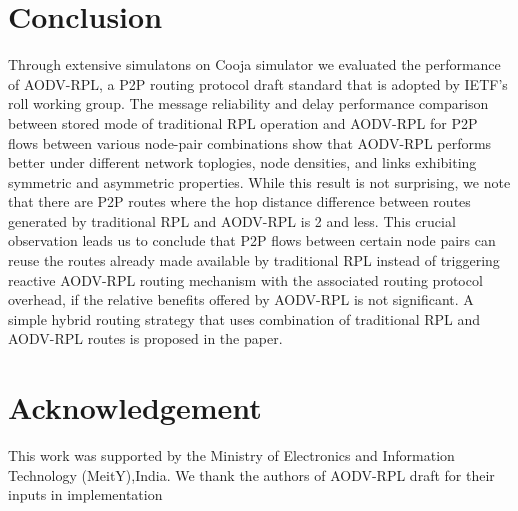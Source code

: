 \documentclass[conference, letterpaper]{IEEEtran}
\begin{document}
\section{Conclusion} \label{Section.V} 

Through extensive simulatons on Cooja simulator we evaluated the performance of
AODV-RPL, a P2P routing protocol draft standard that is adopted by IETF's roll
working group. The message reliability and delay performance comparison between
stored mode of traditional RPL operation and AODV-RPL for P2P flows between
various node-pair combinations show that AODV-RPL performs better under
different network toplogies, node densities, and links exhibiting symmetric and
asymmetric properties. While this result is not surprising, we note that there
are P2P routes where the hop distance difference between routes generated by
traditional RPL and AODV-RPL is 2 and less. This crucial observation leads us to
conclude that P2P flows between certain node pairs can reuse the routes already
made available by traditional RPL instead of triggering reactive AODV-RPL
routing mechanism with the associated routing protocol overhead, if the relative
benefits offered by AODV-RPL is not significant. A simple hybrid routing
strategy that uses combination of traditional RPL and AODV-RPL routes is 
proposed in the paper. 

\section{Acknowledgement}

This work was supported  by the Ministry of Electronics and Information
Technology (MeitY),India. We thank the authors of AODV-RPL draft for their
inputs in implementation 

 

\end{document}
